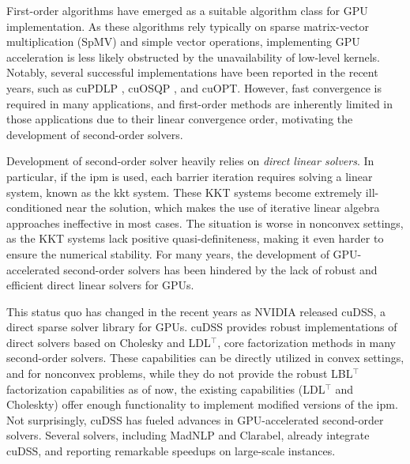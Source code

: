 \documentclass{article}
\begin{document}
First-order algorithms have emerged as a suitable algorithm class for GPU implementation.
As these algorithms rely typically on sparse matrix-vector multiplication (SpMV) and simple vector operations, implementing GPU acceleration is less likely obstructed by the unavailability of low-level kernels.
Notably, several successful implementations have been reported in the recent years, such as cuPDLP \cite{}, cuOSQP \cite{}, and cuOPT.
However, fast convergence is required in many applications, and first-order methods are inherently limited in those applications due to their linear convergence order, motivating the development of second-order solvers.

Development of second-order solver heavily relies on \emph{direct linear solvers}.
In particular, if the \gls*{ipm} is used, each barrier iteration requires solving a linear system, known as the \gls{kkt} system.
These KKT systems become extremely ill-conditioned near the solution, which makes the use of iterative linear algebra approaches ineffective in most cases.
The situation is worse in nonconvex settings, as the KKT systems lack positive quasi-definiteness, making it even harder to ensure the numerical stability.
For many years, the development of GPU-accelerated second-order solvers has been hindered by the lack of robust and efficient direct linear solvers for GPUs.

This status quo has changed in the recent years as NVIDIA released cuDSS, a direct sparse solver library for GPUs. cuDSS provides robust implementations of direct solvers based on Cholesky and LDL$^\top$, core factorization methods in many second-order solvers. These capabilities can be directly utilized in convex settings, and for nonconvex problems, while they do not provide the robust LBL$^\top$ factorization capabilities as of now, the existing capabilities (LDL$^\top$ and Choleskty) offer enough functionality to implement modified versions of the \gls*{ipm}. Not surprisingly, cuDSS has fueled advances in GPU-accelerated second-order solvers. Several solvers, including MadNLP and Clarabel, already integrate cuDSS, and reporting remarkable speedups on large-scale instances.
\end{document}
